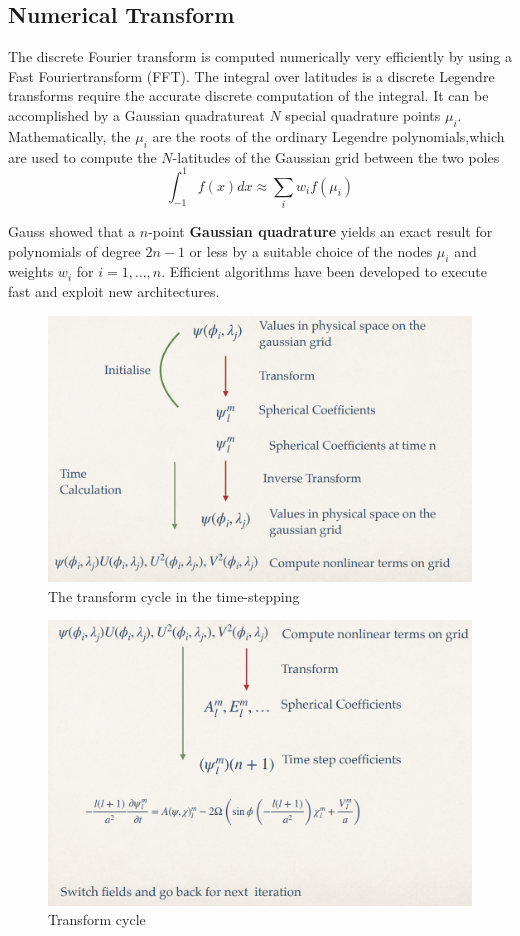 \subsection{Numerical Transform}
The discrete Fourier transform is computed numerically very efficiently by using a Fast Fouriertransform (FFT).
The integral over latitudes is a discrete Legendre transforms require the accurate discrete computation of the integral. It can be accomplished by a Gaussian
quadratureat $N$ special quadrature points $\mu_i$. Mathematically, the $\mu_i$ are the roots of the ordinary Legendre polynomials,which are used to compute the $N$-latitudes of the Gaussian grid between the two poles
$$\int_{-1}^1 f(x)dx\approx\displaystyle\sum_iw_if(\mu_i)$$

Gauss showed that a $n$-point \textbf{Gaussian quadrature} yields an exact result for polynomials of degree $2n-1$ or less by a suitable choice of the nodes $\mu_i$ and weights $w_i$ for $i=1,\dots,n$. Efficient algorithms have been developed to execute fast and exploit new architectures.


\begin{figure}[h!]
    \centering
    \includegraphics[width=0.5\linewidth]{uploads/Screenshot 2024-11-19 125912.png}
    \caption{The transform cycle in the time-stepping}
    \label{fig:transform cycle}
\end{figure}    
\begin{figure}[h!]
    \centering
    \includegraphics[width=0.5\linewidth]{uploads/Screenshot 2024-11-19 130025.png}
    \caption{Transform cycle}
    \label{fig:transform cycle2}
\end{figure}


